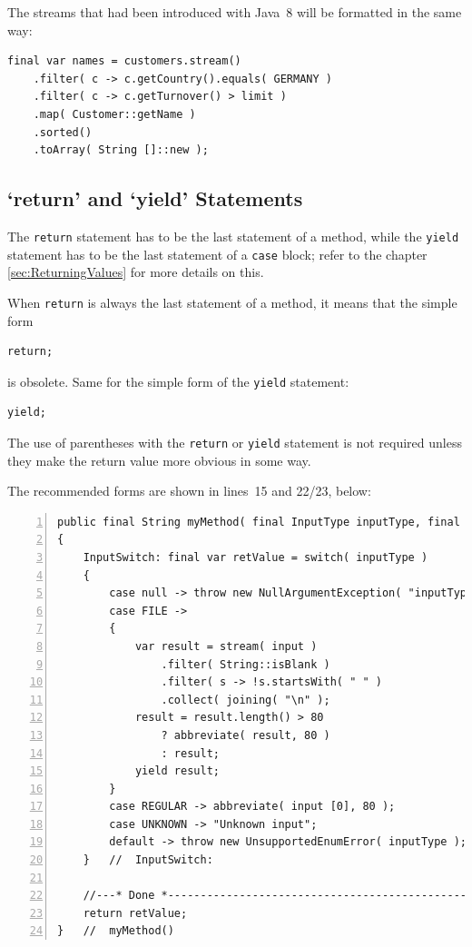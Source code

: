 \documentclass[11pt,a4paper, titlepage, parskip=half, headsepline, footsepline, cleardoublepage=current, headheight=1cm]{scrbook}
\begin{document}
The streams that had been introduced with Java~8 will be formatted in the same way:
\begin{lstlisting}
final var names = customers.stream()
    .filter( c -> c.getCountry().equals( GERMANY )
    .filter( c -> c.getTurnover() > limit )
    .map( Customer::getName )
    .sorted()
    .toArray( String []::new );
\end{lstlisting}


\subsection{‘return’ and ‘yield’ Statements}
The \lstinline|return| statement has to be the last statement of a method, while the \lstinline|yield| statement has to be the last statement of a \lstinline|case| block; refer to the chapter \ref{sec:ReturningValues} for more details on this.

When \lstinline|return| is always the last statement of a method, it means that the simple form
\begin{lstlisting}
return;
\end{lstlisting}
is obsolete. Same for the simple form of the \lstinline|yield| statement:
\begin{lstlisting}
yield;
\end{lstlisting}

The use of parentheses with the \lstinline|return| or \lstinline|yield| statement is not required unless they make the return value more obvious in some way.

The recommended forms are shown in lines~15 and 22/23, below:
\begin{lstlisting}[numbers=left]
public final String myMethod( final InputType inputType, final String... input )
{
    InputSwitch: final var retValue = switch( inputType )
    {
        case null -> throw new NullArgumentException( "inputType" );
        case FILE -> 
        {
            var result = stream( input )
                .filter( String::isBlank )
                .filter( s -> !s.startsWith( " " )
                .collect( joining( "\n" );
            result = result.length() > 80
                ? abbreviate( result, 80 )
                : result;
            yield result;    
        }
        case REGULAR -> abbreviate( input [0], 80 );
        case UNKNOWN -> "Unknown input";
        default -> throw new UnsupportedEnumError( inputType );
    }   //  InputSwitch:
    
    //---* Done *----------------------------------------------------
    return retValue;
}   //  myMethod()
\end{lstlisting}
\end{document}
